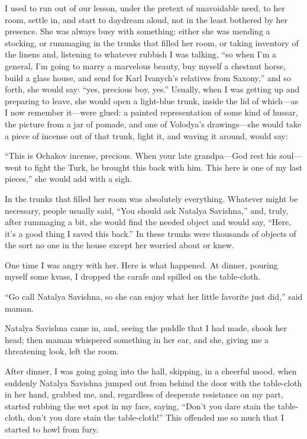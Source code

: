 I used to run out of our lesson, under the pretext of unavoidable need, to her room, settle in, and start to daydream aloud, not in the least bothered by her presence. She was always busy with something: either she was mending a stocking, or rummaging in the trunks that filled her room, or taking inventory of the linens and, listening to whatever rubbish I was talking, ``so when I'm a general, I'm going to marry a marvelous beauty, buy myself a chestnut horse, build a glass house, and send for Karl Ivanych's relatives from Saxony,'' and so forth, she would say: ``yes, precious boy, yes.'' Usually, when I was getting up and preparing to leave, she would open a light-blue trunk, inside the lid of which---as I now remember it---were glued: a painted representation of some kind of hussar, the picture from a jar of pomade, and one of Volodya's drawings---she would take a piece of incense out of that trunk, light it, and waving it around, would say:

``This is Ochakov incense, precious. When your late grandpa---God rest his soul---went to fight the Turk, he brought this back with him. This here is one of my last pieces,'' she would add with a sigh. %

In the trunks that filled her room was absolutely everything. Whatever might be necessary, people usually said, ``You should ask Natalya Savishna,'' and, truly, after rummaging a bit, she would find the needed object and would say, ``Here, it's a good thing I saved this back.'' In these trunks were thousands of objects of the sort no one in the house except her worried about or knew. %

One time I was angry with her. Here is what happened. At dinner, pouring myself some kvass, I dropped the carafe and spilled on the table-cloth.

``Go call Natalya Savishna, so she can enjoy what her little favorite just did,'' said maman.

Natalya Savishna came in, and, seeing the puddle that I had made, shook her head; then maman whispered something in her ear, and she, giving me a threatening look, left the room.

After dinner, I was going going into the hall, skipping, in a cheerful mood, when suddenly Natalya Savishna jumped out from behind the door with the table-cloth in her hand, grabbed me, and, regardless of desperate resistance on my part, started rubbing the wet spot in my face, saying, ``Don't you dare stain the table-cloth, don't you dare stain the table-cloth!'' This offended me so much that I started to howl from fury. %

